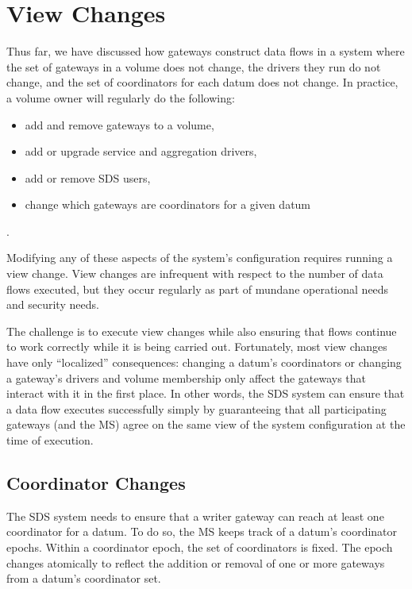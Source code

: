 \section{View Changes}
\label{sec:view-changes}

Thus far, we have discussed how gateways construct data flows in a system
where the set of gateways in a volume does not change, the
drivers they run do not change, and the set of coordinators for each datum does
not change.  In practice, a volume owner will regularly do the following:

\begin{itemize}
   \item add and remove gateways to a volume,
   \item add or upgrade service and aggregation drivers,
   \item add or remove SDS users,
   \item change which gateways are coordinators for a given datum
\end{itemize}.

Modifying any of these aspects of the system's configuration requires running a
view change.  View changes are infrequent with respect to the number of data
flows executed, but they occur regularly as part of mundane
operational needs and security needs.

The challenge is to execute view changes while also ensuring that flows
continue to work correctly while it is being carried out.
Fortunately, most view changes have only
``localized'' consequences:  changing a datum's coordinators or changing
a gateway's drivers and volume membership only affect the gateways that interact
with it in the first place.  In other words, the SDS system can ensure that a
data flow executes successfully simply by guaranteeing that all participating
gateways (and the MS) agree on the same view of the system configuration at the
time of execution.

\subsection{Coordinator Changes}

The SDS system needs to ensure that a writer gateway can reach at least one
coordinator for a datum.  To do so, the MS keeps track of a datum's
coordinator epochs.  Within a coordinator epoch, the set of coordinators is
fixed.  The epoch changes atomically to reflect the addition or removal of one
or more gateways from a datum's coordinator set.

